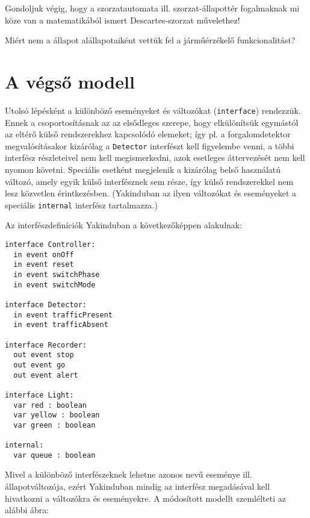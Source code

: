 \begin{feladat}
Gondoljuk végig, hogy a szorzatautomata ill. szorzat-állapottér fogalmaknak mi köze van a matematikából ismert Descartes-szorzat művelethez!
\end{feladat}

\begin{feladat}
Miért nem a  állapot alállapotaiként vettük fel a járműérzékelő funkcionalitást?
\end{feladat}

\section{A végső modell}

Utolsó lépésként a különböző eseményeket és változókat  (\lstinline{interface}) rendezzük. Ennek a csoportosításnak az az elsődleges szerepe, hogy elkülönítsük egymástól az eltérő külső rendszerekhez kapcsolódó elemeket; így pl. a forgalomdetektor megvalósításakor kizárólag a \lstinline{Detector} interfészt kell figyelembe venni, a többi interfész részleteivel nem kell megismerkedni, azok esetleges áttervezését nem kell nyomon követni. Speciális esetként megjelenik a kizárólag belső használatú  változó, amely egyik külső interfésznek sem része, így külső rendszerekkel nem lesz közvetlen érintkezésben. (Yakinduban az ilyen változókat és eseményeket a speciális \lstinline{internal} interfész tartalmazza.)

Az interfészdefiníciók Yakinduban a következőképpen alakulnak:

\begin{lstlisting}
interface Controller:
  in event onOff
  in event reset
  in event switchPhase
  in event switchMode

interface Detector:
  in event trafficPresent
  in event trafficAbsent 

interface Recorder:
  out event stop
  out event go
  out event alert

interface Light:
  var red : boolean
  var yellow : boolean
  var green : boolean

internal:
  var queue : boolean
\end{lstlisting}

Mivel a különböző interfészeknek lehetne azonos nevű eseménye ill. állapotváltozója, ezért Yakinduban mindig az interfész megadásával kell hivatkozni a változókra és eseményekre. A módosított modellt szemlélteti az alábbi ábra:

